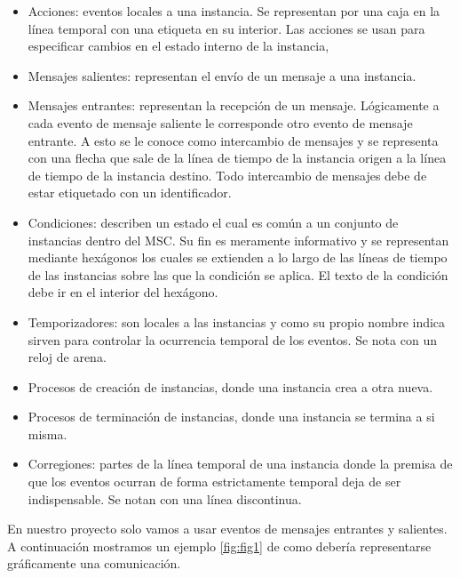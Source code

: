 \begin{itemize}
\item Acciones: eventos locales a una instancia. Se representan por
  una caja en la línea temporal con una etiqueta en su interior. Las
  acciones se usan para especificar cambios en el estado interno de la
  instancia,
\item Mensajes salientes: representan el envío de un mensaje a una
  instancia.
\item Mensajes entrantes: representan la recepción de un
  mensaje. Lógicamente a cada evento de mensaje saliente le
  corresponde otro evento de mensaje entrante. A esto se le conoce
  como intercambio de mensajes y se representa con una flecha que sale
  de la línea de tiempo de la instancia origen a la línea de tiempo de
  la instancia destino. Todo intercambio de mensajes debe de estar
  etiquetado con un identificador.
\item Condiciones: describen un estado el cual es común a un conjunto
  de instancias dentro del MSC. Su fin es meramente informativo y se
  representan mediante hexágonos los cuales se extienden a lo largo de
  las líneas de tiempo de las instancias sobre las que la condición se
  aplica. El texto de la condición debe ir en el interior del
  hexágono.
\item Temporizadores: son locales a las instancias y como su propio
  nombre indica sirven para controlar la ocurrencia temporal de los
  eventos. Se nota con un reloj de arena.
\item Procesos de creación de instancias, donde una instancia crea a
  otra nueva.
\item Procesos de terminación de instancias, donde una instancia se
  termina a si misma.
\item Corregiones: partes de la línea temporal de una instancia donde
  la premisa de que los eventos ocurran de forma estrictamente
  temporal deja de ser indispensable. Se notan con una línea
  discontinua.
\end{itemize}

En nuestro proyecto solo vamos a usar eventos de mensajes entrantes y
salientes. A continuación mostramos un ejemplo \ref{fig:fig1} de como
debería representarse gráficamente una comunicación.


